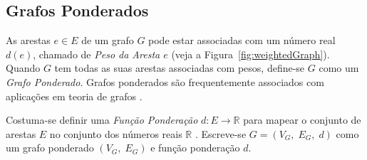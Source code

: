 \subsection{Grafos Ponderados}

As arestas $e\in E$ de um grafo $G$ pode estar associadas com um número real $d(e)$, chamado de \textit{Peso da Aresta $e$} (veja a Figura~\ref{fig:weightedGraph}). Quando $G$ tem todas as suas arestas associadas com pesos, define-se $G$ como um \textit{Grafo Ponderado}. Grafos ponderados são frequentemente associados com aplicações em teoria de grafos \cite{grafosPremioElon}.

Costuma-se definir uma \textit{Função Ponderação} $d: E \longrightarrow \mathbb{R}$ para mapear o conjunto de arestas $E$ no conjunto dos números reais $\mathbb{R}$ \cite{libertiEDG}. Escreve-se $G = (V_G,\;E_G,\;d)$ como um grafo ponderado $(V_G,\; E_G)$ e função ponderação $d$.


